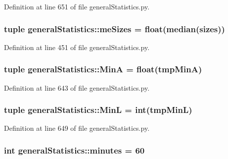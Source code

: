 \-Definition at line 651 of file general\-Statistics.\-py.

\hypertarget{namespacegeneral_statistics_a1cadfe43529f9c53e77c9b1371463c0b}{
\subsubsection[{me\-Sizes}]{\setlength{\rightskip}{0pt plus 5cm}tuple {\bf general\-Statistics\-::me\-Sizes} = float(median({\bf sizes}))}}\label{namespacegeneral_statistics_a1cadfe43529f9c53e77c9b1371463c0b}


\-Definition at line 451 of file general\-Statistics.\-py.

\hypertarget{namespacegeneral_statistics_af6172dcd5abbc1704a9159c48df2627c}{
\subsubsection[{\-Min\-A}]{\setlength{\rightskip}{0pt plus 5cm}tuple {\bf general\-Statistics\-::\-Min\-A} = float(tmp\-Min\-A)}}\label{namespacegeneral_statistics_af6172dcd5abbc1704a9159c48df2627c}


\-Definition at line 643 of file general\-Statistics.\-py.

\hypertarget{namespacegeneral_statistics_a9d940b683251a6dc9ff0313a5f931da1}{
\subsubsection[{\-Min\-L}]{\setlength{\rightskip}{0pt plus 5cm}tuple {\bf general\-Statistics\-::\-Min\-L} = int(tmp\-Min\-L)}}\label{namespacegeneral_statistics_a9d940b683251a6dc9ff0313a5f931da1}


\-Definition at line 649 of file general\-Statistics.\-py.

\hypertarget{namespacegeneral_statistics_ac4f1304faada68628850abb2e6101b10}{
\subsubsection[{minutes}]{\setlength{\rightskip}{0pt plus 5cm}int {\bf general\-Statistics\-::minutes} = 60}}\label{namespacegeneral_statistics_ac4f1304faada68628850abb2e6101b10}


